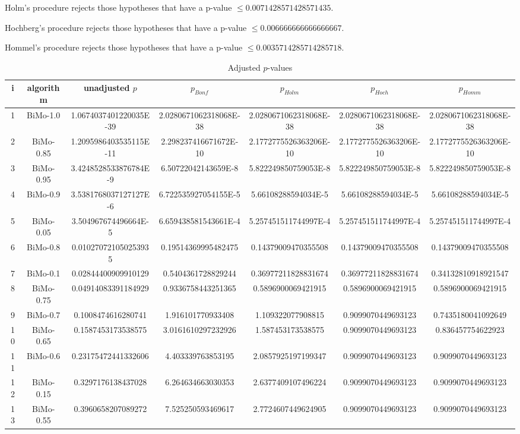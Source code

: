 \documentclass[a4paper,10pt]{article}
\begin{document}
\begin{landscape}
Holm's procedure rejects those hypotheses that have a p-value $\le0.0071428571428571435$.


Hochberg's procedure rejects those hypotheses that have a p-value $\le0.006666666666666667$.


Hommel's procedure rejects those hypotheses that have a p-value $\le0.0035714285714285718$.


\begin{table}[!htp]
\centering\tiny
\caption{Adjusted $p$-values}
\begin{tabular}{ccccccc}
i&algorithm&unadjusted $p$&$p_{Bonf}$&$p_{Holm}$&$p_{Hoch}$&$p_{Homm}$\\
\hline
1&BiMo-1.0&1.0674037401220035E-39&2.0280671062318068E-38&2.0280671062318068E-38&2.0280671062318068E-38&2.0280671062318068E-38\\
2&BiMo-0.85&1.2095986403535115E-11&2.298237416671672E-10&2.1772775526363206E-10&2.1772775526363206E-10&2.1772775526363206E-10\\
3&BiMo-0.95&3.4248528533876784E-9&6.50722042143659E-8&5.822249850759053E-8&5.822249850759053E-8&5.822249850759053E-8\\
4&BiMo-0.9&3.5381768037127127E-6&6.722535927054155E-5&5.66108288594034E-5&5.66108288594034E-5&5.66108288594034E-5\\
5&BiMo-0.05&3.504967674496664E-5&6.659438581543661E-4&5.257451511744997E-4&5.257451511744997E-4&5.257451511744997E-4\\
6&BiMo-0.8&0.010270721050253935&0.19514369995482475&0.14379009470355508&0.14379009470355508&0.14379009470355508\\
7&BiMo-0.1&0.02844400909910129&0.5404361728829244&0.36977211828831674&0.36977211828831674&0.34132810918921547\\
8&BiMo-0.75&0.04914083391184929&0.9336758443251365&0.5896900069421915&0.5896900069421915&0.5896900069421915\\
9&BiMo-0.7&0.1008474616280741&1.916101770933408&1.109322077908815&0.9099070449693123&0.7435180041092649\\
10&BiMo-0.65&0.1587453173538575&3.0161610297232926&1.587453173538575&0.9099070449693123&0.836457754622923\\
11&BiMo-0.6&0.23175472441332606&4.403339763853195&2.0857925197199347&0.9099070449693123&0.9099070449693123\\
12&BiMo-0.15&0.3297176138437028&6.264634663030353&2.6377409107496224&0.9099070449693123&0.9099070449693123\\
13&BiMo-0.55&0.3960658207089272&7.525250593469617&2.7724607449624905&0.9099070449693123&0.9099070449693123\\

\end{tabular}
\end{table}
\end{landscape}
\end{document}

